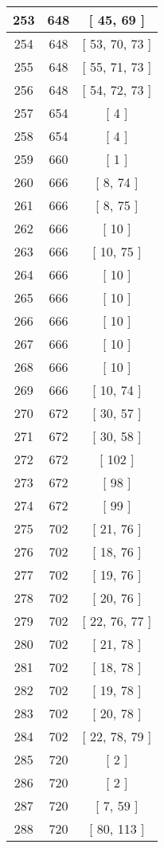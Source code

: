 \begin{center}
\begin{longtable}[H]{|| c c c ||}
253 & 648 & [ 45, 69 ] \\ 
\hline
254 & 648 & [ 53, 70, 73 ] \\ 
\hline
255 & 648 & [ 55, 71, 73 ] \\ 
\hline
256 & 648 & [ 54, 72, 73 ] \\ 
\hline
257 & 654 & [ 4 ] \\ 
\hline
258 & 654 & [ 4 ] \\ 
\hline
259 & 660 & [ 1 ] \\ 
\hline
260 & 666 & [ 8, 74 ] \\ 
\hline
261 & 666 & [ 8, 75 ] \\ 
\hline
262 & 666 & [ 10 ] \\ 
\hline
263 & 666 & [ 10, 75 ] \\ 
\hline
264 & 666 & [ 10 ] \\ 
\hline
265 & 666 & [ 10 ] \\ 
\hline
266 & 666 & [ 10 ] \\ 
\hline
267 & 666 & [ 10 ] \\ 
\hline
268 & 666 & [ 10 ] \\ 
\hline
269 & 666 & [ 10, 74 ] \\ 
\hline
270 & 672 & [ 30, 57 ] \\ 
\hline
271 & 672 & [ 30, 58 ] \\ 
\hline
272 & 672 & [ 102 ] \\ 
\hline
273 & 672 & [ 98 ] \\ 
\hline
274 & 672 & [ 99 ] \\ 
\hline
275 & 702 & [ 21, 76 ] \\ 
\hline
276 & 702 & [ 18, 76 ] \\ 
\hline
277 & 702 & [ 19, 76 ] \\ 
\hline
278 & 702 & [ 20, 76 ] \\ 
\hline
279 & 702 & [ 22, 76, 77 ] \\ 
\hline
280 & 702 & [ 21, 78 ] \\ 
\hline
281 & 702 & [ 18, 78 ] \\ 
\hline
282 & 702 & [ 19, 78 ] \\ 
\hline
283 & 702 & [ 20, 78 ] \\ 
\hline
284 & 702 & [ 22, 78, 79 ] \\ 
\hline
285 & 720 & [ 2 ] \\ 
\hline
286 & 720 & [ 2 ] \\ 
\hline
287 & 720 & [ 7, 59 ] \\ 
\hline
288 & 720 & [ 80, 113 ] \\ 

\end{longtable}
\end{center}

